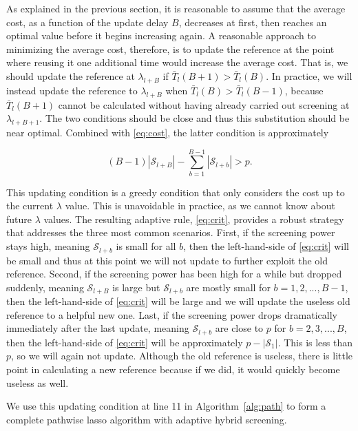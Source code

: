 \documentclass[]{interact}
\theoremstyle{plain}%
\theoremstyle{definition}
\theoremstyle{remark}
\begin{document}
As explained in the previous section, it is reasonable to assume that the average cost, as a function of the update delay $B$, decreases at first, then reaches an optimal value before it begins increasing again. A reasonable approach to minimizing the average cost, therefore, is to update the reference at the point where reusing it one additional time would increase the average cost. That is, we should update the reference at $\lambda_{l+B}$ if $\bar{T}_l(B+1)>\bar{T}_l(B)$. In practice, we will instead update the reference to $\lambda_{l+B}$ when $\bar{T}_l(B)>\bar{T}_l(B-1)$, because $\bar{T}_l(B+1)$ cannot be calculated without having already carried out screening at $\lambda_{l+B+1}$. The two conditions should be close and thus this substitution should be near optimal. Combined with \eqref{eq:cost}, the latter condition is approximately

\begin{equation}
    \label{eq:crit}
    (B-1)|\mathcal{S}_{l+B}|-\sum_{b=1}^{B-1}|\mathcal{S}_{l+b}|>p.
\end{equation}


This updating condition is a greedy condition that only considers the cost up to the current $\lambda$ value. This is unavoidable in practice, as we cannot know about future $\lambda$ values. The resulting adaptive rule, \eqref{eq:crit}, provides a robust strategy that addresses the three most common scenarios. First, if the screening power stays high, meaning $\mathcal{S}_{l+b}$ is small for all $b$, then the left-hand-side of \eqref{eq:crit} will be small and thus at this point we will not update to further exploit the old reference. Second, if the screening power has been high for a while but dropped suddenly, meaning $\mathcal{S}_{l+B}$ is large but $\mathcal{S}_{l+b}$ are mostly small for $b=1,2,...,B-1$, then the left-hand-side of \eqref{eq:crit} will be large and we will update the useless old reference to a helpful new one. Last, if the screening power drops dramatically immediately after the last update, meaning $\mathcal{S}_{l+b}$ are close to $p$ for $b=2,3,...,B$, then the left-hand-side of \eqref{eq:crit} will be approximately $p-|\mathcal{S}_1|$. This is less than $p$, so we will again not update.  Although the old reference is useless, there is little point in calculating a new reference because if we did, it would quickly become useless as well.

We use this updating condition at line 11 in Algorithm~\ref{alg:path} to form a complete pathwise lasso algorithm with adaptive hybrid screening. 
\end{document}
